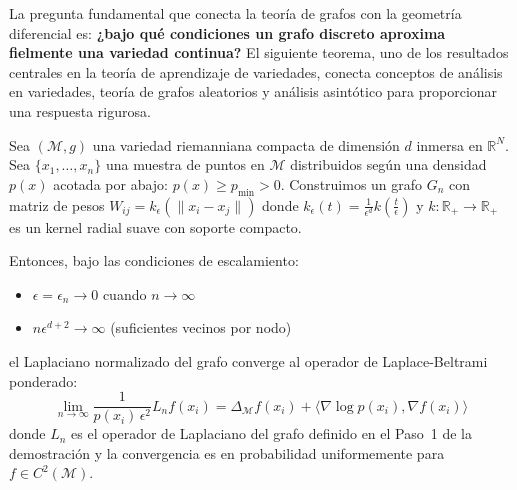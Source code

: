 La pregunta fundamental que conecta la teoría de grafos con la geometría diferencial es: \textbf{¿bajo qué condiciones un grafo discreto aproxima fielmente una variedad continua?} El siguiente teorema, uno de los resultados centrales en la teoría de aprendizaje de variedades, conecta conceptos de análisis en variedades, teoría de grafos aleatorios y análisis asintótico para proporcionar una respuesta rigurosa.

\begin{theorem}\label{thm:convergencia_grafos_variedades_detallado}
	Sea $(\mathcal{M}, g)$ una variedad riemanniana compacta de dimensión $d$ inmersa en $\mathbb{R}^N$. Sea $\{x_1, \ldots, x_n\}$ una muestra de puntos en $\mathcal{M}$ distribuidos según una densidad $p(x)$ acotada por abajo: $p(x) \geq p_{\min} > 0$. Construimos un grafo $G_n$ con matriz de pesos $W_{ij} = k_\epsilon(\|x_i - x_j\|)$ donde $k_\epsilon(t) = \frac{1}{\epsilon^d} k\left(\frac{t}{\epsilon}\right)$ y $k: \mathbb{R}_+ \to \mathbb{R}_+$ es un kernel radial suave con soporte compacto.

	Entonces, bajo las condiciones de escalamiento:
	\begin{itemize}
		\item $\epsilon = \epsilon_n \to 0$ cuando $n \to \infty$
		\item $n\epsilon^{d+2} \to \infty$ (suficientes vecinos por nodo)
	\end{itemize}

	el Laplaciano normalizado del grafo converge al operador de Laplace-Beltrami ponderado:
	\[
		\lim_{n \to \infty} \frac{1}{p(x_i)\,\epsilon^2} L_n f(x_i) = \Delta_\mathcal{M} f(x_i) + \langle \nabla \log p(x_i), \nabla f(x_i) \rangle
	\]
	donde $L_n$ es el operador de Laplaciano del grafo definido en el Paso~1 de la demostración y la convergencia es en probabilidad uniformemente para $f \in C^2(\mathcal{M})$.
\end{theorem}

